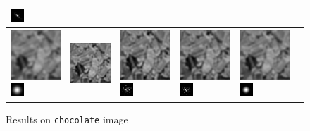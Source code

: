 \begin{figure}
\begin{tabular}{|l|l|l|l|l|l|}
\includegraphics[width=0.5cm]{results/chocolate_kernel3_MAPkreg_k.png}
\\ 
 \hline\includegraphics[width=2.5cm]{results/chocolate_kernelgauss_blurred.png}
\includegraphics[width=0.5cm]{images/kernelgauss}
& \includegraphics[width=2.5cm]{results/chocolate_kernelgauss_nonblind_deconv.png}
&\includegraphics[width=2.5cm]{results/chocolate_kernelgauss_MAPxk_x.png}
\includegraphics[width=0.5cm]{results/chocolate_kernelgauss_MAPxk_k.png}
&\includegraphics[width=2.5cm]{results/chocolate_kernelgauss_MAPk_x.png}
\includegraphics[width=0.5cm]{results/chocolate_kernelgauss_MAPk_k.png}
&\includegraphics[width=2.5cm]{results/chocolate_kernelgauss_MAPkreg_x.png}
\includegraphics[width=0.5cm]{results/chocolate_kernelgauss_MAPkreg_k.png}
\\ 
 \hline\end{tabular} 

    \caption{Results on \texttt{chocolate} image}\label{fig:results_chocolate}
    \end{figure}
